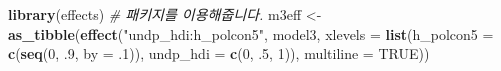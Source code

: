 \documentclass[]{book}
\newenvironment{Shaded}{\begin{snugshade}}{\end{snugshade}}
\newcommand{\CommentTok}[1]{\textcolor[rgb]{0.56,0.35,0.01}{\textit{#1}}}
\newcommand{\DataTypeTok}[1]{\textcolor[rgb]{0.13,0.29,0.53}{#1}}
\newcommand{\DecValTok}[1]{\textcolor[rgb]{0.00,0.00,0.81}{#1}}
\newcommand{\FloatTok}[1]{\textcolor[rgb]{0.00,0.00,0.81}{#1}}
\newcommand{\KeywordTok}[1]{\textcolor[rgb]{0.13,0.29,0.53}{\textbf{#1}}}
\newcommand{\NormalTok}[1]{#1}
\newcommand{\OtherTok}[1]{\textcolor[rgb]{0.56,0.35,0.01}{#1}}
\newcommand{\StringTok}[1]{\textcolor[rgb]{0.31,0.60,0.02}{#1}}
\begin{document}
\begin{Shaded}
\begin{Highlighting}[]
\KeywordTok{library}\NormalTok{(effects) }\CommentTok{# 패키지를 이용해줍니다.}
\NormalTok{m3eff <-}\StringTok{ }\KeywordTok{as_tibble}\NormalTok{(}\KeywordTok{effect}\NormalTok{(}\StringTok{"undp_hdi:h_polcon5"}\NormalTok{, model3, }
                              \DataTypeTok{xlevels =} \KeywordTok{list}\NormalTok{(}\DataTypeTok{h_polcon5 =} \KeywordTok{c}\NormalTok{(}\KeywordTok{seq}\NormalTok{(}\DecValTok{0}\NormalTok{, }\FloatTok{.9}\NormalTok{, }\DataTypeTok{by =} \FloatTok{.1}\NormalTok{)), }
                                             \DataTypeTok{undp_hdi =} \KeywordTok{c}\NormalTok{(}\DecValTok{0}\NormalTok{, }\FloatTok{.5}\NormalTok{, }\DecValTok{1}\NormalTok{)), }
                              \DataTypeTok{multiline =} \OtherTok{TRUE}\NormalTok{))}


\end{Highlighting}
\end{Shaded}
\end{document}
